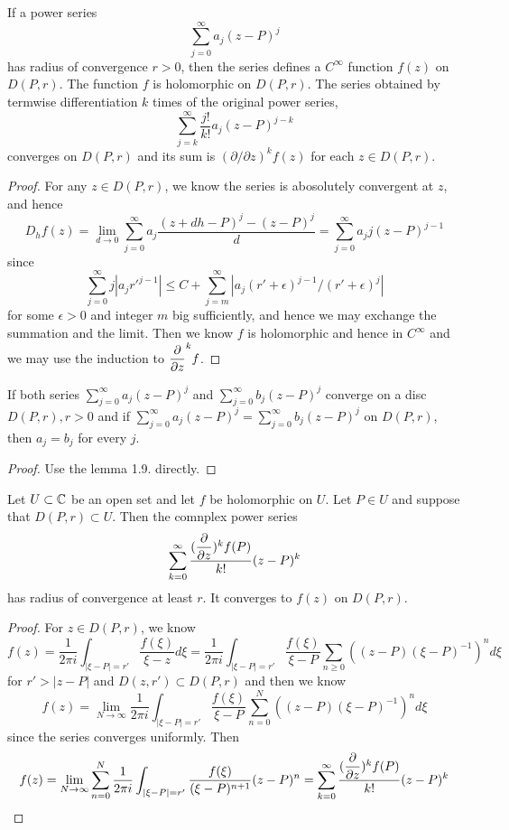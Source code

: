 \begin{lemma}
    If a power series
    \[\sum\limits_{j=0}^{\infty}a_j(z-P)^j\]
    has radius of convergence $r>0$, then the series defines a $C^{\infty}$ function $f(z)$ on $D(P,r)$. The function $f$ is holomorphic on $D(P,r)$. The series obtained by termwise differentiation $k$ times of the original power series,
    \[
    \sum\limits_{j=k}^{\infty}\dfrac{j!}{k!}a_j(z-P)^{j-k}
    \]
    converges on $D(P,r)$ and its sum is $(\partial/\partial z)^k f(z)$ for each $z\in D(P,r)$. 
\end{lemma}
\begin{proof}\par
    For any $z\in D(P,r)$, we know the series is abosolutely convergent at $z$, and hence
    \[
    D_h f(z) = \lim_{d\to 0}\sum\limits_{j=0}^{\infty}a_j\dfrac{(z+dh-P)^j-(z-P)^j}{d} = \sum\limits_{j=0}^{\infty} a_jj(z-P)^{j-1}
    \]
    since
    \[
    \sum\limits_{j=0}^{\infty} j|a_jr'^{j-1}| \leq C + \sum\limits_{j=m}^{\infty}|a_j(r'+\epsilon)^{j-1}/(r'+\epsilon)^{j}|
    \]
    for some $\epsilon > 0$ and integer $m$ big sufficiently, and hence we may exchange the summation and the limit. Then we know $f$ is holomorphic and hence in $C^{\infty}$ and we may use the induction to $\dfrac{\partial}{\partial z}^k f$.
\end{proof}

\begin{proposition}
    If both series $\sum_{j=0}^{\infty} a_j(z-P)^j$ and $\sum_{j=0}^{\infty} b_j(z-P)^j$ converge on a disc $D(P,r), r > 0$ and if $\sum_{j=0}^{\infty}a_j(z-P)^j = \sum_{j=0}^{\infty} b_j(z-P)^j$ on $D(P,r)$, then $a_j = b_j$ for every $j$.  
\end{proposition}
\begin{proof}\par
    Use the lemma 1.9. directly.
\end{proof}

\begin{theorem}
    Let $U\subset\mathbb{C}$ be an open set and let $f$ be holomorphic on $U$. Let $P\in U$ and suppose that $D(P,r)\subset U$. Then the comnplex power series
    \[\sum\limits_{k=0}^{\infty} \dfrac{(\dfrac{\partial}{\partial z})^kf(P)}{k!}(z-P)^k\]
    has radius of convergence at least $r$. It converges to $f(z)$ on $D(P,r)$.
\end{theorem}
\begin{proof}\par
    For $z\in D(P,r)$, we know
    \[
    f(z) = \dfrac{1}{2\pi i}\int_{|\xi-P| = r'}\dfrac{f(\xi)}{\xi-z}d\xi = \dfrac{1}{2\pi i}\int_{|\xi-P| = r'}\dfrac{f(\xi)}{\xi-P}\sum\limits_{n\geq 0}((z-P)(\xi-P)^{-1})^nd\xi
    \]
    for $r' > |z-P|$ and $D(z,r')\subset D(P,r)$ and then we know
    \[
    f(z) = \lim_{N\to\infty}\dfrac{1}{2\pi i}\int_{|\xi-P| = r'}\dfrac{f(\xi)}{\xi-P}\sum\limits_{n= 0}^N((z-P)(\xi-P)^{-1})^nd\xi
    \]
    since the series converges uniformly. Then
    \[
    f(z) = \lim_{N\to\infty}\sum\limits_{n=0}^N \dfrac{1}{2\pi i }\int_{|\xi-P| = r'}\dfrac{f(\xi)}{(\xi-P)^{n+1}}(z-P)^n = \sum\limits_{k=0}^{\infty} \dfrac{(\dfrac{\partial}{\partial z})^kf(P)}{k!}(z-P)^k
    \]
\end{proof}

